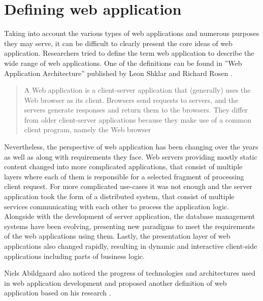 


\section{Defining web application}

Taking into account the various types of web applications and numerous purposes they may serve, it can be difficult to clearly present the core ideas of web application. Researchers tried to define the term web application to describe the wide range of web applications. One of the definitions can be found in ''Web Application Architecture'' published by Leon Shklar and Richard Rosen \cite{WebAppArchitecture}.

\begin{quotation}
A Web application is a client-server application that (generally) uses the Web browser as its client. Browsers send requests to servers, and the servers generate responses and return them to the browsers. They differ from older client-server applications because they make use of a common client program, namely the Web browser
\end{quotation}

Nevertheless, the perspective of web application has been changing over the years as well as along with requirements they face. Web servers providing mostly static content changed into more complicated applications, that consist of multiple layers where each of them is responsible for a selected fragment of processing client request. For more complicated use-cases it was not enough and the server application took the form of a distributed system, that consist of multiple services communicating with each other to process the application logic. Alongside with the development of server application, the database management systems have been evolving, presenting new paradigms to meet the requirements of the web applications using them. Lastly, the presentation layer of web applications also changed rapidly, resulting in dynamic and interactive client-side applications including parts of business logic.

Niels Abildgaard also noticed the progress of technologies and architectures used in web application development and proposed another definition of web application based on his research \cite{PerspectivesOnArchitectureEvolution}.

